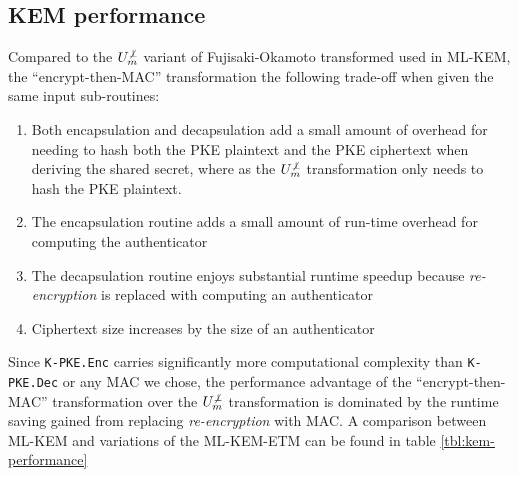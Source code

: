 \documentclass[floatrow,journal=tches,submission]{iacrtrans}
\newcommand{\encrypt}{\texttt{Enc}}
\newcommand{\decrypt}{\texttt{Dec}}
\begin{document}
\subsection{KEM performance}
Compared to the $U^{\not\bot}_m$ variant of Fujisaki-Okamoto transformed used in ML-KEM, the ``encrypt-then-MAC'' transformation the following trade-off when given the same input sub-routines: \begin{enumerate}
    \item Both encapsulation and decapsulation add a small amount of overhead for needing to hash both the PKE plaintext and the PKE ciphertext when deriving the shared secret, where as the $U^{\not\bot}_m$ transformation only needs to hash the PKE plaintext.
    \item The encapsulation routine adds a small amount of run-time overhead for computing the authenticator
    \item The decapsulation routine enjoys substantial runtime speedup because \emph{re-encryption} is replaced with computing an authenticator
    \item Ciphertext size increases by the size of an authenticator
\end{enumerate}

Since \texttt{K-PKE.\encrypt} carries significantly more computational complexity than \texttt{K-PKE.\decrypt} or any MAC we chose, the performance advantage of the ``encrypt-then-MAC'' transformation over the $U^{\not\bot}_m$ transformation is dominated by the runtime saving gained from replacing \emph{re-encryption} with MAC. A comparison between ML-KEM and variations of the ML-KEM-ETM can be found in table \ref{tbl:kem-performance}
\end{document}
